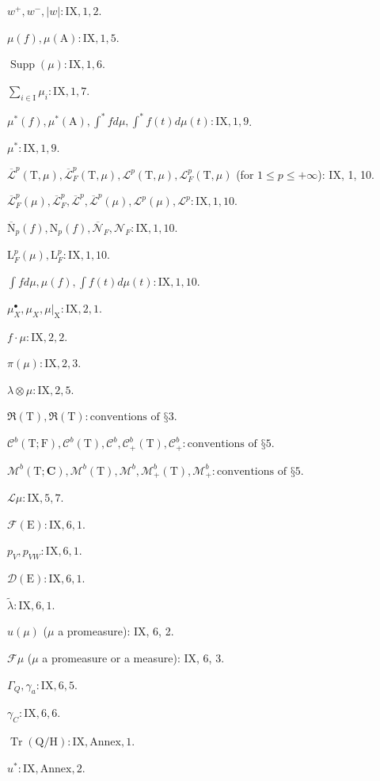 \(w^{+}, w^{-}, |w|: \mathrm{IX}, 1, 2\).

\(\mu(f), \mu(\mathrm{A}): \mathrm{IX}, 1, 5\).

\(\operatorname{Supp}(\mu): \mathrm{IX}, 1, 6\).

\(\sum_{i \in \mathrm{I}} \mu_i: \mathrm{IX}, 1, 7\).

\(\mu^*(f), \mu^*(\mathrm{A}), \int^* f d\mu, \int^* f(t) d\mu(t): \mathrm{IX}, 1, 9\).

\(\mu^*: \mathrm{IX}, 1, 9\).

\(\overline{\mathcal{L}}^p(\mathrm{T}, \mu), \overline{\mathcal{L}}_F^p(\mathrm{T}, \mu), \mathcal{L}^p(\mathrm{T}, \mu), \mathcal{L}_F^p(\mathrm{T}, \mu)\) (for \(1 \leqslant p \leqslant +\infty\)): IX, 1, 10.

\(\overline{\mathcal{L}}_F^p(\mu), \overline{\mathcal{L}}_F^p, \overline{\mathcal{L}}^p, \overline{\mathcal{L}}^p(\mu), \mathcal{L}^p(\mu), \mathcal{L}^p: \mathrm{IX}, 1, 10\).

\(\overline{\mathrm{N}}_p(f), \mathrm{N}_p(f), \overline{\mathcal{N}}_F, \mathcal{N}_F: \mathrm{IX}, 1, 10\).

\(\mathrm{L}_F^p(\mu), \mathrm{L}_F^p: \mathrm{IX}, 1, 10\).

\(\int f d\mu, \mu(f), \int f(t) d\mu(t): \mathrm{IX}, 1, 10\).

\(\mu_X^\bullet, \mu_X, \mu|_{\mathrm{X}}: \mathrm{IX}, 2, 1\).

\(f \cdot \mu: \mathrm{IX}, 2, 2\).

\(\pi(\mu): \mathrm{IX}, 2, 3\).

\(\lambda \otimes \mu: \mathrm{IX}, 2, 5\).

\(\Re(\mathrm{T}), \Re(\mathrm{T}): \text{conventions of §3}\).

\(\mathcal{C}^b(\mathrm{T}; \mathrm{F}), \mathcal{C}^b(\mathrm{T}), \mathcal{C}^b, \mathcal{C}_+^b(\mathrm{T}), \mathcal{C}_+^b: \text{conventions of §5}\).

\(\mathcal{M}^b(\mathrm{T}; \mathbf{C}), \mathcal{M}^b(\mathrm{T}), \mathcal{M}^b, \mathcal{M}_+^b(\mathrm{T}), \mathcal{M}_+^b: \text{conventions of §5}\).

\(\mathcal{L}\mu: \mathrm{IX}, 5, 7\).

\(\mathcal{F}(\mathrm{E}): \mathrm{IX}, 6, 1\).

\(p_V, p_{VW}: \mathrm{IX}, 6, 1\).

\(\mathcal{D}(\mathrm{E}): \mathrm{IX}, 6, 1\).

\(\widetilde{\lambda}: \mathrm{IX}, 6, 1\).

\(u(\mu)\) (\(\mu\) a promeasure): IX, 6, 2.

\(\mathcal{F}\mu\) (\(\mu\) a promeasure or a measure): IX, 6, 3.

\(\Gamma_Q, \gamma_a: \mathrm{IX}, 6, 5\).

\(\gamma_C: \mathrm{IX}, 6, 6\).

\(\operatorname{Tr}(\mathrm{Q}/\mathrm{H}): \mathrm{IX}, \text{Annex}, 1\).

\(u^*: \mathrm{IX}, \text{Annex}, 2\).
